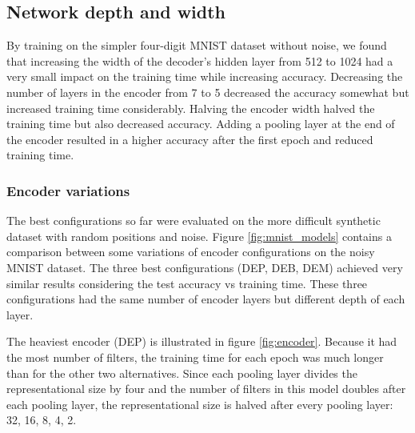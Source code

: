 


\subsection{Network depth and width} \label{sssec:exp_encoder}

By training on the simpler four-digit MNIST dataset without noise,
we found that increasing the width of the decoder's hidden layer from 512 to 1024 had a very small impact on the training time while increasing accuracy. Decreasing the number of layers in the encoder from 7 to 5 decreased the accuracy somewhat but increased training time considerably. Halving the encoder width halved the training time but also decreased accuracy. Adding a pooling layer at the end of the encoder resulted in a higher accuracy after the first epoch and reduced training time.

\subsubsection{Encoder variations}



The best configurations so far were evaluated on the more difficult synthetic dataset with random positions and noise. Figure \ref{fig:mnist_models} contains a comparison between some variations of encoder configurations on the noisy MNIST dataset. The three best configurations (DEP, DEB, DEM) achieved very similar results considering the test accuracy vs training time. These three configurations had the same number of encoder layers but different depth of each layer.

The heaviest encoder (DEP) is illustrated in figure \ref{fig:encoder}.
Because it had the most number of filters, the training time for each epoch was much longer than for the other two alternatives.
Since each pooling layer divides the representational size by four and the number of filters in this model doubles after each pooling layer, the representational size is halved after every pooling layer: 32, 16, 8, 4, 2.

